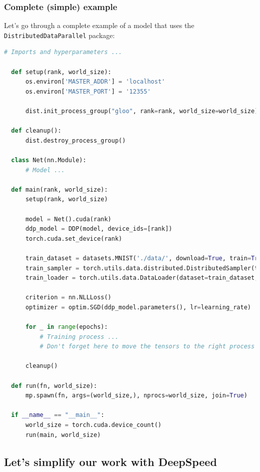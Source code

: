 \documentclass{article}
\begin{document}
\subsubsection{Complete (simple) example}
Let's go through a complete example of a model that uses the \lstinline{DistributedDataParallel} package:
\begin{lstlisting}[language=Python]
  # Imports and hyperparameters ...

  def setup(rank, world_size):
      os.environ['MASTER_ADDR'] = 'localhost'
      os.environ['MASTER_PORT'] = '12355'

      dist.init_process_group("gloo", rank=rank, world_size=world_size)

  def cleanup():
      dist.destroy_process_group()

  class Net(nn.Module):
      # Model ...

  def main(rank, world_size):
      setup(rank, world_size)

      model = Net().cuda(rank)
      ddp_model = DDP(model, device_ids=[rank])
      torch.cuda.set_device(rank)

      train_dataset = datasets.MNIST('./data/', download=True, train=True, transform=transform)
      train_sampler = torch.utils.data.distributed.DistributedSampler(train_dataset, num_replicas=world_size, rank=rank, shuffle=False)
      train_loader = torch.utils.data.DataLoader(dataset=train_dataset, batch_size=batch_size, shuffle=False, pin_memory=True, sampler=train_sampler)

      criterion = nn.NLLLoss()
      optimizer = optim.SGD(ddp_model.parameters(), lr=learning_rate)

      for _ in range(epochs):
          # Training process ...
          # Don't forget here to move the tensors to the right process using the .cuda(rank) method!

      cleanup()

  def run(fn, world_size):
      mp.spawn(fn, args=(world_size,), nprocs=world_size, join=True)

  if __name__ == "__main__":
      world_size = torch.cuda.device_count()
      run(main, world_size)
\end{lstlisting}

\subsection{Let's simplify our work with DeepSpeed}

\clearpage
\printglossaries

\clearpage


\clearpage

\end{document}
